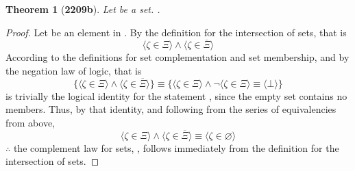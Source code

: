 \documentclass[preview]{standalone}
\newtheorem{theorem}{Theorem}
\begin{document}
\begin{theorem}[\textbf{2209b}]
    Let \bm{$\Xi$} be a set. 
    \bm{$\Xi \cap \overline{\Xi} = \varnothing$}.
\end{theorem}
\begin{proof}
    Let \bm{$\zeta$} be an element in \bm{$\Xi \cap \overline{\Xi}$}. 
    By the definition for the intersection of sets, that is
    \begin{equation*}
        \Big \langle \zeta \in \Xi \Big \rangle 
            \land 
        \Big \langle \zeta \in \overline{\Xi} \Big \rangle
    \end{equation*} 
    According to the definitions for set complementation and set membership, 
    and by the negation law of logic, that is
    \begin{equation*}
        \Bigg\{
            \Big \langle \zeta \in \Xi \Big \rangle 
                \land 
            \Big \langle \zeta \in \overline{\Xi} \Big \rangle
        \Bigg\}
            \equiv
        \Bigg\{
            \Big \langle \zeta \in \Xi \Big \rangle 
                \land 
            \lnot \Big \langle \zeta \in \Xi \Big \rangle
                \equiv
            \Big \langle \bot \Big \rangle
        \Bigg\}
    \end{equation*}
    \bm{$\big \langle \bot \big \rangle$} is trivially the logical identity for 
    the statement \bm{$\zeta \in \varnothing$}, 
    since the empty set contains no members. 
    Thus, 
    by that identity, 
    and following from the series of equivalencies from above,
    \begin{equation*}
        \Big \langle \zeta \in \Xi \Big \rangle 
            \land 
        \Big \langle \zeta \in \overline{\Xi} \Big \rangle 
            \equiv
        \Big \langle \zeta \in \varnothing \Big \rangle
    \end{equation*}
    $\therefore$ the complement law for sets, 
    \bm{$\Xi \cap \overline{\Xi} = \varnothing$}, 
    follows immediately from the definition for the intersection of sets.
\end{proof}
\end{document}
